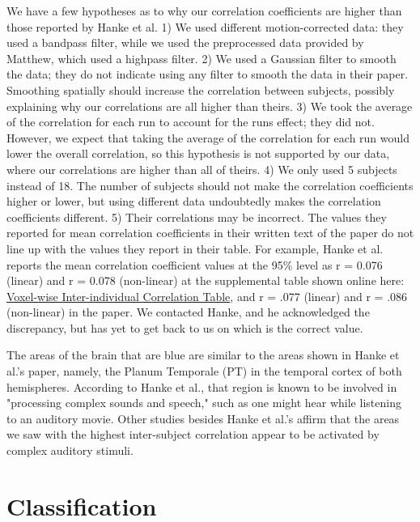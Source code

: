 \documentclass[11pt]{article}
\begin{document}
We have a few hypotheses as to why our correlation coefficients are 
higher than those reported by Hanke et al.  1) We used 
different motion-corrected data: they used a bandpass filter, while we 
used the preprocessed data provided by Matthew, which used a highpass
filter.  2) We used a Gaussian filter to smooth the data; they do not 
indicate using any filter to smooth the data in their paper.  Smoothing 
spatially should increase the correlation between subjects, possibly 
explaining why our correlations are all higher than theirs.  3) We 
took the average of the correlation for each run to account for the runs
effect; they did not.  However, we expect that taking the average of 
the correlation for each run would lower the overall correlation, so
this hypothesis is not supported by our data, where our correlations
are higher than all of theirs.   4) We only used 5 subjects instead of
18.  The number of subjects should not make the correlation coefficients
higher or lower, but using different data undoubtedly makes the
correlation coefficients different.  5) Their correlations may be incorrect.
The values they reported for mean correlation coefficients in their 
written text of the paper do not line up with the values they report in 
their table.  For example, Hanke et al. reports the mean correlation 
coefficient values at the 95\% level as r = 0.076 (linear) and r = 0.078 
(non-linear) at the supplemental table shown online here: \href{http://www.nature.com/articles/sdata20143/tables/5}{Voxel-wise Inter-individual Correlation Table}, and r = .077 (linear) 
and r = .086 (non-linear) in the paper.  We contacted Hanke, and he acknowledged 
the discrepancy, but has yet to get back to us on which is the correct value.  

The areas of the brain that are blue are similar to the areas shown in Hanke 
et al.'s paper, namely, the Planum Temporale (PT) in the temporal cortex of both 
hemispheres.  According to Hanke et al., that region is known to be involved in 
"processing complex sounds and speech,"\cite{hank2014audiomovie} such as one 
might hear while listening to an auditory movie.  Other studies besides 
Hanke et al.'s affirm that the areas we saw with the highest inter-subject
correlation appear to be activated by complex auditory stimuli\cite{chevillet2011functional}.

\section{Classification}
\end{document}
